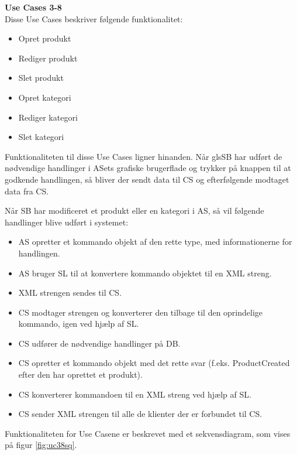\textbf{Use Cases 3-8}\\
Disse Use Cases beskriver følgende funktionalitet:
\begin{itemize}
	\item Opret produkt
	\item Rediger produkt
	\item Slet produkt
	\item Opret kategori
	\item Rediger kategori
	\item Slet kategori
\end{itemize}
Funktionaliteten til disse Use Cases ligner hinanden. Når gls{SB} har udført de nødvendige handlinger i \gls{AS}ets grafiske brugerflade og trykker på knappen til at godkende handlingen, så bliver der sendt data til \gls{CS} og efterfølgende modtaget data fra \gls{CS}.

Når \gls{SB} har modificeret et produkt eller en kategori i \gls{AS}, så vil følgende handlinger blive udført i systemet:
\begin{itemize}
	\item \gls{AS} opretter et kommando objekt af den rette type, med informationerne for handlingen.
	\item \gls{AS} bruger \gls{SL} til at konvertere kommando objektet til en XML streng.
	\item XML strengen sendes til \gls{CS}.
	\item \gls{CS} modtager strengen og konverterer den tilbage til den oprindelige kommando, igen ved hjælp af \gls{SL}.
	\item \gls{CS} udfører de nødvendige handlinger på \gls{DB}.
	\item \gls{CS} opretter et kommando objekt med det rette svar (f.eks. ProductCreated efter den har oprettet et produkt).
	\item \gls{CS} konverterer kommandoen til en XML streng ved hjælp af \gls{SL}.
	\item \gls{CS} sender XML strengen til alle de klienter der er forbundet til \gls{CS}.
\end{itemize}

Funktionaliteten for Use Casene er beskrevet med et sekvensdiagram, som vises på figur \ref{fig:uc38sq}.

